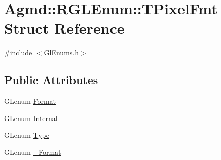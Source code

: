 \hypertarget{struct_agmd_1_1_r_g_l_enum_1_1_t_pixel_fmt}{\section{Agmd\+:\+:R\+G\+L\+Enum\+:\+:T\+Pixel\+Fmt Struct Reference}
\label{struct_agmd_1_1_r_g_l_enum_1_1_t_pixel_fmt}
}


{\ttfamily \#include $<$Gl\+Enums.\+h$>$}

\subsection*{Public Attributes}
\begin{DoxyCompactItemize}
\item 
G\+Lenum \hyperlink{struct_agmd_1_1_r_g_l_enum_1_1_t_pixel_fmt_aab183e4deb51de4d53046260176851cb}{Format}
\item 
G\+Lenum \hyperlink{struct_agmd_1_1_r_g_l_enum_1_1_t_pixel_fmt_ad238c5e11a0fda9403c572d75b3654b5}{Internal}
\item 
G\+Lenum \hyperlink{struct_agmd_1_1_r_g_l_enum_1_1_t_pixel_fmt_acb87a50325e7fac7df121e6d96da8806}{Type}
\item 
G\+Lenum \hyperlink{struct_agmd_1_1_r_g_l_enum_1_1_t_pixel_fmt_a5c9cf05464fa12fade8a7348e73a5477}{\+\_\+\+Format}
\end{DoxyCompactItemize}


